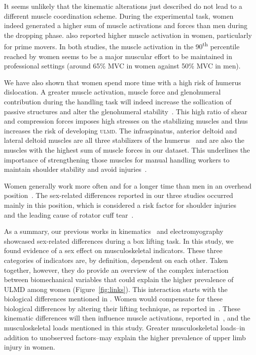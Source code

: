 It seems unlikely that the kinematic alterations just described do not lead to a different muscle coordination scheme.
During the experimental task, women indeed generated a higher sum of muscle activations and forces than men during the dropping phase.
\citet{Bouffard2019-fd} also reported higher muscle activation in women, particularly for prime movers.
In both studies, the muscle activation in the 90\textsuperscript{th} percentile reached by women seems to be a major muscular effort to be maintained in professional settings (around 65\% MVC in women against 50\% MVC in men).

We have also shown that women spend more time with a high risk of humerus dislocation.
A greater muscle activation, muscle force and glenohumeral contribution during the handling task will indeed increase the sollication of passive structures and alter the glenohumeral stability~\cite{Bergmann2007-zj}.
This high ratio of shear and compression forces imposes high stresses on the stabilizing muscles and thus increases the risk of developing \textsc{ulmd}.
The infraspinatus, anterior deltoid and lateral deltoid muscles are all three stabilizers of the humerus~\cite{Blache2017-pv, Yanagawa2008-es} and are also the muscles with the highest sum of muscle forces in our dataset.
This underlines the importance of strengthening those muscles for manual handling workers to maintain shoulder stability and avoid injuries~\cite{Sharkey1995-gl}.

Women generally work more often and for a longer time than men in an overhead position~\cite{Dahlberg2004-mw}.
The sex-related differences reported in our three studies occurred mainly in this position, which is considered a risk factor for shoulder injuries~\cite{Antony2010-ji, Dal_Maso2016-ol, Grieve2008-je} and the leading cause of rotator cuff tear~\cite{Palmerud2000-mp, Vecchio1995-ke}.

As a summary, our previous works in kinematics~\cite{Martinez2019-mm} and electromyography~\cite{Bouffard2019-fd} showcased sex-related differences during a box lifting task.
In this study, we found evidence of a sex effect on musculoskeletal indicators.
These three categories of indicators are, by definition, dependent on each other.
Taken together, however, they do provide an overview of the complex interaction between biomechanical variables that could explain the higher prevalence of ULMD among women (Figure~\ref{fig:links}).
This interaction starts with the biological differences mentioned in \citet{Cote2012-hn}.
Women would compensate for these biological differences by altering their lifting technique, as reported in~\cite{Martinez2019-mm}.
These kinematic differences will then influence muscle activations, reported in~\cite{Bouffard2019-fd}, and the musculoskeletal loads mentioned in this study.
Greater musculoskeletal loads--in addition to unobserved factors--may explain the higher prevalence of upper limb injury in women.

